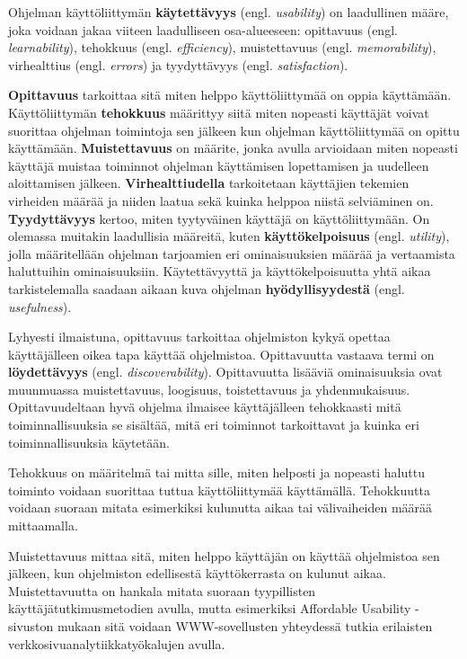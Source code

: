 \documentclass[utf8]{gradu3}
\begin{document}
\label{general-usability-requirements}
Ohjelman käyttöliittymän \textbf{käytettävyys} (engl. \textit{usability}) on laadullinen määre, joka voidaan jakaa viiteen laadulliseen osa-alueeseen: opittavuus (engl. \textit{learnability}), tehokkuus (engl. \textit{efficiency}), muistettavuus (engl. \textit{memorability}), virhealttius (engl. \textit{errors}) ja tyydyttävyys (engl. \textit{satisfaction}). 

\textbf{Opittavuus} tarkoittaa sitä miten helppo käyttöliittymää on oppia käyttämään. Käyttöliittymän \textbf{tehokkuus} määrittyy siitä miten nopeasti käyttäjät voivat suorittaa ohjelman toimintoja sen jälkeen kun ohjelman käyttöliittymää on opittu käyttämään. \textbf{Muistettavuus} on määrite, jonka avulla arvioidaan miten nopeasti käyttäjä muistaa toiminnot ohjelman käyttämisen lopettamisen ja uudelleen aloittamisen jälkeen. \textbf{Virhealttiudella} tarkoitetaan käyttäjien tekemien virheiden määrää ja niiden laatua sekä kuinka helppoa niistä selviäminen on. \textbf{Tyydyttävyys} kertoo, miten tyytyväinen käyttäjä on käyttöliittymään. On olemassa muitakin laadullisia määreitä, kuten \textbf{käyttökelpoisuus} (engl. \textit{utility}), jolla määritellään ohjelman tarjoamien eri ominaisuuksien määrää ja vertaamista haluttuihin ominaisuuksiin. Käytettävyyttä ja käyttökelpoisuutta yhtä aikaa tarkistelemalla saadaan aikaan kuva ohjelman \textbf{hyödyllisyydestä} (engl. \textit{usefulness}). \parencite[]{usability-101}

Lyhyesti ilmaistuna, opittavuus tarkoittaa ohjelmiston kykyä opettaa käyttäjälleen oikea tapa käyttää ohjelmistoa. Opittavuutta vastaava termi on \textbf{löydettävyys} (engl. \textit{discoverability}). Opittavuutta lisääviä ominaisuuksia ovat muunmuassa muistettavuus, loogisuus, toistettavuus ja yhdenmukaisuus. Opittavuudeltaan hyvä ohjelma ilmaisee käyttäjälleen tehokkaasti mitä toiminnallisuuksia se sisältää, mitä eri toiminnot tarkoittavat ja kuinka eri toiminnallisuuksia käytetään. \parencite[]{improving-learnability}

Tehokkuus on määritelmä tai mitta sille, miten helposti ja nopeasti haluttu toiminto voidaan suorittaa tuttua käyttöliittymää käyttämällä. Tehokkuutta voidaan suoraan mitata esimerkiksi kulunutta aikaa tai välivaiheiden määrää mittaamalla. 

Muistettavuus mittaa sitä, miten helppo käyttäjän on käyttää ohjelmistoa sen jälkeen, kun ohjelmiston edellisestä käyttökerrasta on kulunut aikaa. Muistettavuutta on hankala mitata suoraan tyypillisten käyttäjätutkimusmetodien avulla, mutta esimerkiksi Affordable Usability -sivuston \parencite[]{affordable-usability} mukaan sitä voidaan WWW-sovellusten yhteydessä tutkia erilaisten verkkosivuanalytiikkatyökalujen avulla.
\end{document}
